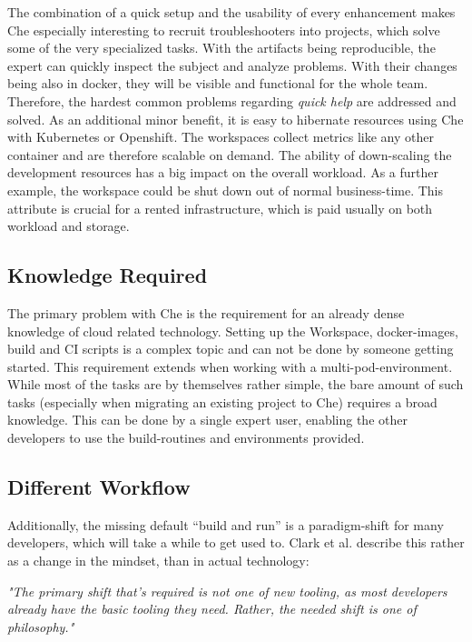 \documentclass[english,utf8]{lni}
\begin{document}
The combination of a quick setup and the usability of every enhancement makes Che especially interesting to recruit troubleshooters into projects, which solve some of the very specialized tasks.  
With  the  artifacts  being  reproducible,  the  expert  can quickly inspect the subject and analyze problems.
With their changes being also in docker, they will be visible and functional for the whole team.
Therefore,  the  hardest  common  problems  regarding \textit{quick help} are addressed and solved. 
As an additional minor benefit, it is easy to hibernate resources  using  Che  with  Kubernetes  or  Openshift.
The workspaces collect metrics like any other container and are therefore scalable on demand. 
The ability of down-scaling the development resources has a big impact on the overall 
workload. 
As a further example, the workspace could be shut down out of normal business-time. This attribute is crucial for a rented infrastructure, which is paid usually on both workload and storage. 
\subsection{Knowledge Required}
The primary problem with Che is the requirement for an already dense knowledge of cloud related technology.
Setting up the Workspace, docker-images, build and CI scripts is a complex topic and can not be done by someone getting started. 
This requirement extends when working with a multi-pod-environment. 
While most of the tasks are by themselves rather simple, the bare amount of such tasks (especially when migrating an existing project to Che) requires a broad knowledge.
This can be done by a single expert user, enabling the other developers  to  use  the  build-routines and  environments provided.

\subsection{Different Workflow}
Additionally, the missing default “build and run” is a paradigm-shift for many developers, which will take a while to get used to. 
Clark et al. \cite{CL14} describe this rather as a change in the mindset, than in actual technology: 

\begin{centering}
	\textit{"The primary shift that’s required is not one of new tooling, as most developers already have the basic tooling they need.\newline 
	Rather, the needed shift is one of philosophy."}
\end{centering}
\end{document}
